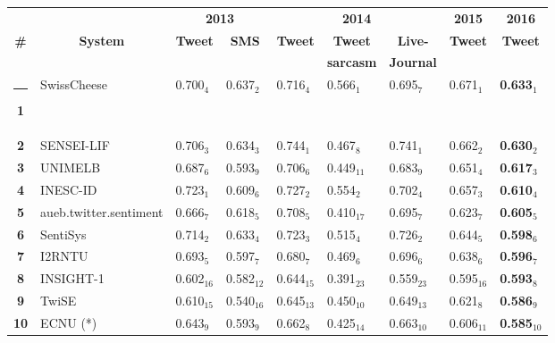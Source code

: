 \documentclass[11pt,letterpaper]{article}
\begin{document}
\renewcommand{\baselinestretch}{0.78}
\begin{table}[thb!]
  \centering
  \begin{small}
    \renewcommand{\arraystretch}{1.0}%
    \resizebox{\textwidth}{!} {
    \begin{tabular}{|c|l|ll|lll|l|l|}
      \hline\rule[0ex]{0mm}{2ex} 
      & & \multicolumn{2}{c|}{\bf 2013} & \multicolumn{3}{c|}{\bf 2014} & \multicolumn{1}{c|}{\bf 2015} & \multicolumn{1}{c|}{\bf 2016} \\
      \bf \# & \multicolumn{1}{c|}{\bf System} & \multicolumn{1}{c}{\bf Tweet} & \multicolumn{1}{c|}{\bf SMS} & \multicolumn{1}{c}{\bf Tweet} & \multicolumn{1}{c}{\bf Tweet} & \multicolumn{1}{c|}{\bf Live-} & \multicolumn{1}{c|}{\bf Tweet} & \multicolumn{1}{c|}{\bf Tweet} \\
      & & & & \bf & \bf sarcasm & \bf Journal & & \bf \\
      \hline\rule[0ex]{-1mm}{2ex} 
      \bf 1 & SwissCheese & 0.700$_{4}$ & 0.637$_{2}$ & 0.716$_{4}$ & 0.566$_{1}$ & 0.695$_{7}$ & 0.671$_{1}$ & \bf 0.633$_{1}$ \\
      \bf 2 & SENSEI-LIF & 0.706$_{3}$ & 0.634$_{3}$ & 0.744$_{1}$ & 0.467$_{8}$ & 0.741$_{1}$ & 0.662$_{2}$ & \bf 0.630$_{2}$ \\
      \bf 3 & UNIMELB & 0.687$_{6}$ & 0.593$_{9}$ & 0.706$_{6}$ & 0.449$_{11}$ & 0.683$_{9}$ & 0.651$_{4}$ & \bf 0.617$_{3}$ \\
      \bf 4 & INESC-ID & 0.723$_{1}$ & 0.609$_{6}$ & 0.727$_{2}$ & 0.554$_{2}$ & 0.702$_{4}$ & 0.657$_{3}$ & \bf 0.610$_{4}$ \\
      \bf 5 & aueb.twitter.sentiment & 0.666$_{7}$ & 0.618$_{5}$ & 0.708$_{5}$ & 0.410$_{17}$ & 0.695$_{7}$ & 0.623$_{7}$ & \bf 0.605$_{5}$ \\
      \bf 6 & SentiSys & 0.714$_{2}$ & 0.633$_{4}$ & 0.723$_{3}$ & 0.515$_{4}$ & 0.726$_{2}$ & 0.644$_{5}$ & \bf 0.598$_{6}$ \\
      \bf 7 & I2RNTU & 0.693$_{5}$ & 0.597$_{7}$ & 0.680$_{7}$ & 0.469$_{6}$ & 0.696$_{6}$ & 0.638$_{6}$ & \bf 0.596$_{7}$ \\
      \bf 8 & INSIGHT-1 & 0.602$_{16}$ & 0.582$_{12}$ & 0.644$_{15}$ & 0.391$_{23}$ & 0.559$_{23}$ & 0.595$_{16}$ & \bf 0.593$_{8}$ \\
      \bf 9 & TwiSE & 0.610$_{15}$ & 0.540$_{16}$ & 0.645$_{13}$ & 0.450$_{10}$ & 0.649$_{13}$ & 0.621$_{8}$ & \bf 0.586$_{9}$ \\
      \bf 10 & ECNU (*) & 0.643$_{9}$ & 0.593$_{9}$ & 0.662$_{8}$ & 0.425$_{14}$ & 0.663$_{10}$ & 0.606$_{11}$ & \bf 0.585$_{10}$ \\

\end{tabular}}
\end{small}
\end{table}
\end{document}
